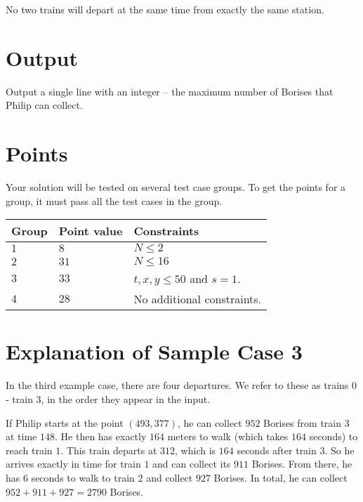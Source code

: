 No two trains will depart at the same time from exactly the same station.

\section*{Output}
Output a single line with an integer -- the maximum number of Borises that Philip can collect.

\section*{Points}
Your solution will be tested on several test case groups.
To get the points for a group, it must pass all the test cases in the group.

\noindent
\begin{tabular}{| l | l | l |}
  \hline
  \textbf{Group} & \textbf{Point value} & \textbf{Constraints} \\ \hline
  $1$   & $8$        & $N \le 2$ \\ \hline
  $2$   & $31$       & $N \le 16$ \\ \hline
  $3$   & $33$       & $t, x, y \le 50$ and $s = 1$. \\ \hline
  $4$   & $28$       & No additional constraints. \\ \hline
\end{tabular}

\section*{Explanation of Sample Case 3}
In the third example case, there are four departures.
We refer to these as trains $0$ - train $3$, in the order they appear in the input.

If Philip starts at the point $(493,377)$, he can collect $952$ Borises from train $3$ at time $148$. He then has exactly $164$ meters to walk (which takes $164$ seconds) to reach train $1$. This train departs at $312$, which is $164$ seconds after train $3$.
So he arrives exactly in time for train $1$ and can collect its $911$ Borises. From there, he has $6$ seconds to walk to train $2$ and collect $927$ Borises. In total, he can collect $952 + 911 + 927 = 2790$ Borises.

